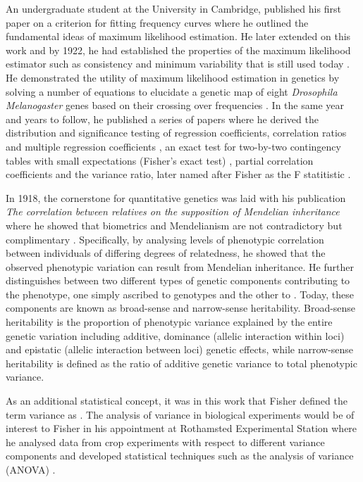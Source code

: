 An undergraduate student at the University in Cambridge, \citet{Fisher1912} published his first paper on a criterion for fitting frequency curves where he outlined the fundamental ideas of maximum likelihood estimation. He later extended on this work and by 1922, he had established the properties of the maximum likelihood estimator such as consistency and minimum variability \citep{Fisher1922a} that is still used today \citep{Hald1999}. He demonstrated the utility of maximum likelihood estimation in genetics by solving a number of equations to elucidate a genetic map of eight \textit{Drosophila Melanogaster} genes based on their crossing over frequencies \citep{Fisher1922b}. In the same year and years to follow, he published a series of papers where he derived the distribution and significance testing of regression coefficients, correlation ratios and multiple regression coefficients \citep{Fisher1922c,Fisher1928}, an exact test for two-by-two contingency tables with small expectations (Fisher's exact test) \citep{Fisher1922d}, partial correlation coefficients \citep{Fisher1924a} and the variance ratio, later named after Fisher as the F statitistic \citep{Fisher1924b}. 

In 1918, the cornerstone for quantitative genetics was laid with his publication \textit{The correlation between relatives on the supposition of Mendelian inheritance} where he showed that biometrics and Mendelianism are not contradictory but complimentary \citep{Fisher1918}. Specifically, by analysing levels of phenotypic correlation between individuals of differing degrees of relatedness, he showed that the observed phenotypic variation can result from Mendelian inheritance. He further distinguishes between two different types of genetic components contributing to the phenotype, one simply ascribed to genotypes and the other to . Today, these components are known as broad-sense and narrow-sense heritability. Broad-sense heritability is the proportion of phenotypic variance explained by the entire genetic variation including additive, dominance (allelic interaction within loci) and epistatic (allelic interaction between loci) genetic effects, while narrow-sense heritability is defined as the ratio of additive genetic variance to total phenotypic variance. 

As an additional statistical concept, it was in this work that Fisher defined the term variance as . The analysis of variance in biological experiments would be of interest to Fisher in his appointment at Rothamsted Experimental Station where he analysed data from crop experiments with respect to different variance components and developed statistical techniques such as the analysis of variance (ANOVA) \citep{Fisher1921,Fisher1923,Eden1929}. 

